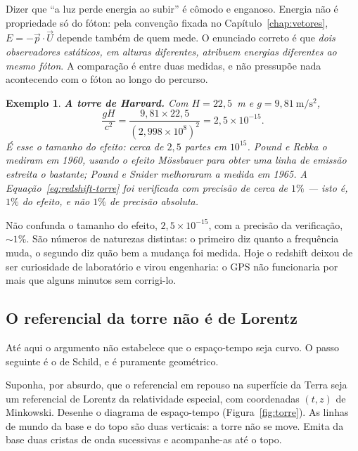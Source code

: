\documentclass[12pt,a4paper,oneside]{book}
\theoremstyle{rgplain}
\newtheorem{example}{Exemplo}[chapter]
\theoremstyle{rgremark}
\begin{document}
\begin{atencao}
Dizer que ``a luz perde energia ao subir'' é cômodo e enganoso. Energia não é
propriedade só do fóton: pela convenção fixada no
Capítulo~\ref{chap:vetores}, $E=-\vec p\cdot\vec U$ depende também de quem
mede. O enunciado correto é que \emph{dois observadores estáticos, em alturas
diferentes, atribuem energias diferentes ao mesmo fóton}. A comparação é entre
duas medidas, e não pressupõe nada acontecendo com o fóton ao longo do
percurso.
\end{atencao}

\begin{example}
\textbf{A torre de Harvard.} Com $H=22{,}5$~m e $g=9{,}81~\mathrm{m/s^2}$,
\[
  \frac{gH}{c^2}=\frac{9{,}81\times22{,}5}{(2{,}998\times10^{8})^2}
  =2{,}5\times10^{-15} .
\]
É esse o tamanho do efeito: cerca de $2{,}5$ partes em $10^{15}$. Pound e Rebka o mediram
em 1960, usando o efeito Mössbauer para obter uma linha de emissão estreita o
bastante; Pound e Snider melhoraram a medida em 1965. A
Equação~\eqref{eq:redshift-torre} foi verificada com precisão de cerca de
$1\%$ --- isto é, $1\%$ \emph{do efeito}, e não $1\%$ de precisão absoluta.
\end{example}

\begin{atencao}[title={\sffamily\bfseries\footnotesize\color{rgTerracota}DUAS PRECISÕES DIFERENTES}]
Não confunda o tamanho do efeito, $2{,}5\times10^{-15}$, com a precisão da
verificação, $\sim1\%$. São números de naturezas distintas: o primeiro diz
quanto a frequência muda, o segundo diz quão bem a mudança foi medida. Hoje o
redshift deixou de ser curiosidade de laboratório e virou engenharia: o GPS
não funcionaria por mais que alguns minutos sem corrigi-lo.
\end{atencao}

\subsection*{O referencial da torre não é de Lorentz}

Até aqui o argumento não estabelece que o espaço-tempo seja curvo. O passo
seguinte é o de Schild, e é puramente geométrico.

Suponha, por absurdo, que o referencial em repouso na superfície da Terra seja
um referencial de Lorentz da relatividade especial, com coordenadas $(t,z)$ de
Minkowski. Desenhe o diagrama de espaço-tempo (Figura~\ref{fig:torre}). As
linhas de mundo da base e do topo são duas verticais: a torre não se move.
Emita da base duas cristas de onda sucessivas e acompanhe-as até o topo.
\end{document}
